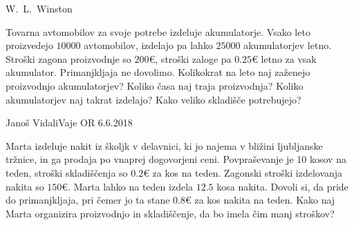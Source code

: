 \begin{naloga}{W.~L.~Winston}{\cite[\S15, Example~5]{w}}
\begin{vprasanje}
Tovarna avtomobilov za svoje potrebe izdeluje akumulatorje.
Vsako leto proizvedejo $10000$ avtomobilov,
izdelajo pa lahko $25000$ akumulatorjev letno.
Stroški zagona proizvodnje so $200 €$,
stroški zaloge pa $0.25 €$ letno za vsak akumulator.
Primanjkljaja ne dovolimo.
Kolikokrat na leto naj zaženejo proizvodnjo akumulatorjev?
Koliko časa naj traja proizvodnja?
Koliko akumulatorjev naj takrat izdelajo?
Kako veliko skladišče potrebujejo?
\end{vprasanje}
\begin{odgovor}
\end{odgovor}
\end{naloga}


\begin{naloga}{Janoš Vidali}{Vaje OR 6.6.2018}
\begin{vprasanje}
Marta izdeluje nakit iz školjk v delavnici,
ki jo najema v bližini ljubljanske tržnice,
in ga prodaja po vnaprej dogovorjeni ceni.
Povpraševanje je 10 kosov na teden,
stroški skladiščenja so $0.2 €$ za kos na teden.
Zagonski stroški izdelovanja nakita so $150 €$.
Marta lahko na teden izdela $12.5$ kosa nakita.
Dovoli si, da pride do primanjkljaja,
pri čemer jo ta stane $0.8 €$ za kos nakita na teden.
Kako naj Marta organizira proizvodnjo in skladiščenje,
da bo imela čim manj stroškov?
\end{vprasanje}
\begin{odgovor}
\end{odgovor}
\end{naloga}
